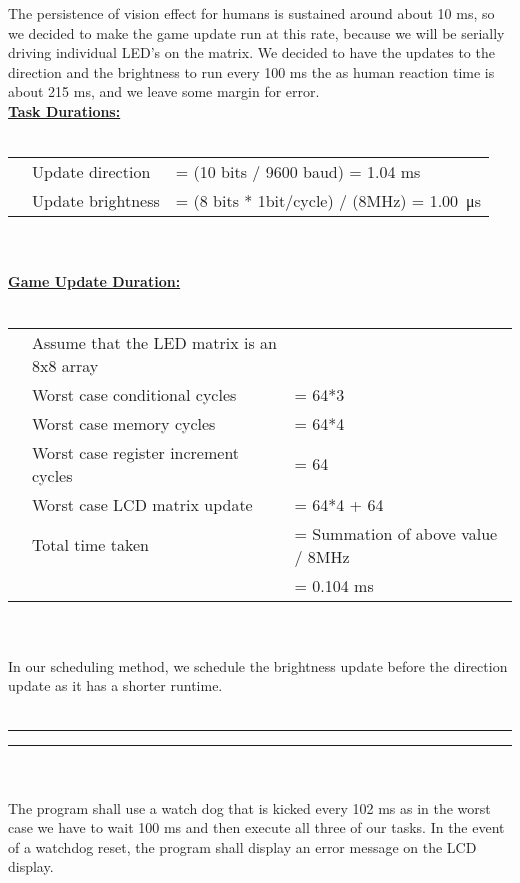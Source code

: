\documentclass[11pt]{article}
\newcommand{\question}[2] {
    \noindent \begin{minipage}{\textwidth}
        \vspace{.25in} \hrule\vspace{0.5em}
        \noindent{\bf #1: #2} \vspace{0.5em}
        \hrule \vspace{.10in}
    \end{minipage} \\ \\
}
\begin{document}
    The persistence of vision effect for humans is sustained around about 10 ms, so we decided to make the game
    update run at this rate, because we will be serially driving individual LED's on the matrix. We decided to have the 
    updates to the direction and the brightness to run every 100 ms the as human reaction time is about 215 ms, and
    we leave some margin for error. \\

    \noindent \textbf{\underline{Task Durations:}} \\ \\
    \begin{tabular}{rll}
        \indent & Update direction &= (10 bits / 9600 baud) = 1.04 ms \\
        & Update brightness &= (8 bits * 1bit/cycle) / (8MHz) = \SI{1.00}{\micro\second} \\
    \end{tabular} \\ \\

    \noindent \textbf{\underline{Game Update Duration:}} \\ \\
    \begin{tabular}{rll}
        \indent & Assume that the LED matrix is an 8x8 array	& \\
        & Worst case conditional cycles &= 64*3 \\
        & Worst case memory cycles &= 64*4 \\
        & Worst case register increment cycles &= 64 \\
        & Worst case LCD matrix update &= 64*4 + 64 \\
        & Total time taken &= Summation of above value / 8MHz \\
        & &= 0.104 ms
    \end{tabular} \\ \\

    In our scheduling method, we schedule the brightness update before the direction update as it has a shorter runtime. \\ \\

\question{Part 6}{Watchdog/COP}
    \indent The program shall use a watch dog that is kicked every 102 ms as in the worst case we have to
    wait 100 ms and then execute all three of our tasks. In the event of a watchdog reset, the
    program shall display an error message on the LCD display. \\ \\
\end{document}
